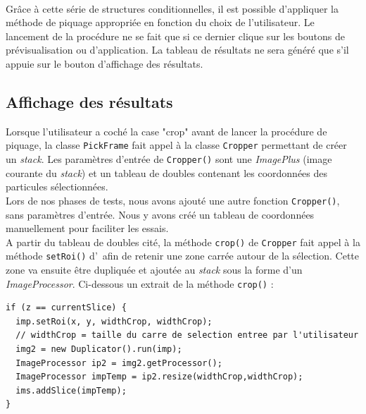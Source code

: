 \paragraph*{}
Grâce à cette série de structures conditionnelles, il est possible d'appliquer la méthode de piquage appropriée en fonction du choix de l'utilisateur. Le lancement de la procédure ne se fait que si ce dernier clique sur les boutons de prévisualisation ou d'application. La tableau de résultats ne sera généré que s'il appuie sur le bouton d'affichage des résultats. 
\pagebreak
\subsection{Affichage des résultats}

Lorsque l'utilisateur a coché la case "crop" avant de lancer la procédure de piquage, la classe \texttt{PickFrame} fait appel à la classe \texttt{Cropper} permettant de créer un \textit{stack}. Les paramètres d'entrée de \texttt{Cropper()} sont une \emph{ImagePlus} (image courante du \textit{stack}) et un tableau de doubles contenant les coordonnées des particules sélectionnées. \\
Lors de nos phases de tests, nous avons ajouté une autre fonction \texttt{Cropper()}, sans paramètres d'entrée. Nous y avons créé un tableau de coordonnées manuellement pour faciliter les essais. \\
A partir du tableau de doubles cité, la méthode \texttt{crop()} de \texttt{Cropper} fait appel à la méthode \texttt{setRoi()} d'\imj ~afin de retenir une zone carrée autour de la sélection. Cette zone va ensuite être dupliquée et ajoutée au \textit{stack} sous la forme d'un \emph{ImageProcessor}. Ci-dessous un extrait de la méthode \texttt{crop()} : 

\begin{center}
\begin{fmpage}{16cm}
\begin{small}
\begin{lstlisting}
if (z == currentSlice) {
  imp.setRoi(x, y, widthCrop, widthCrop);  
  // widthCrop = taille du carre de selection entree par l'utilisateur
  img2 = new Duplicator().run(imp);
  ImageProcessor ip2 = img2.getProcessor();
  ImageProcessor impTemp = ip2.resize(widthCrop,widthCrop);
  ims.addSlice(impTemp);
}
\end{lstlisting}
\end{small}	
\end{fmpage}
\end{center}

